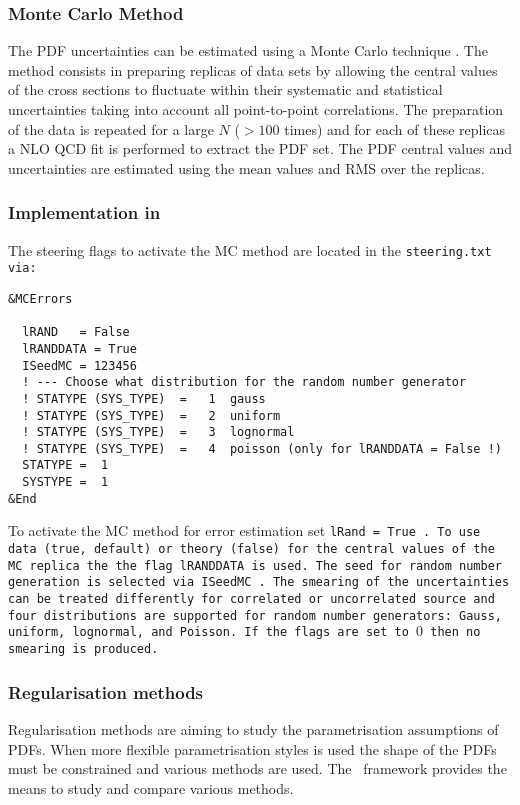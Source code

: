 \subsubsection{Monte Carlo Method}
\label{sec:ToyMC}

The PDF uncertainties can be estimated using a Monte Carlo technique \cite{Giele:1998gw, mcmethod2}.
The method consists in preparing replicas of data sets by allowing the central values of the cross sections to 
fluctuate within their systematic and statistical uncertainties taking into account all point-to-point correlations.
The preparation of the data is repeated for a large $N$ ($>100$ times) and for each of these replicas a NLO QCD fit is performed to 
extract the PDF set. The PDF central values and uncertainties are estimated using the mean values and RMS 
over the replicas. 
\subsubsection{Implementation in \fitter\ }
The steering flags to activate the MC method are located in the \tt steering.txt \rm via:

\begin{verbatim}
&MCErrors

  lRAND   = False  
  lRANDDATA = True
  ISeedMC = 123456 
  ! --- Choose what distribution for the random number generator 
  ! STATYPE (SYS_TYPE)  =   1  gauss
  ! STATYPE (SYS_TYPE)  =   2  uniform
  ! STATYPE (SYS_TYPE)  =   3  lognormal
  ! STATYPE (SYS_TYPE)  =   4  poisson (only for lRANDDATA = False !)
  STATYPE =  1
  SYSTYPE =  1
&End
\end{verbatim}
To activate the MC method for error estimation set \tt lRand = True \rm.
To use data (true, default) or theory (false) for the central values of the MC replica
the the flag \tt lRANDDATA \rm is used. The seed for random number generation is selected 
via \tt ISeedMC \rm . The smearing of the uncertainties can be treated differently for correlated 
or uncorrelated source and four distributions are supported for random number generators: Gauss, uniform, lognormal, and Poisson. If the flags are set to $0$ then no smearing is produced.




\subsubsection{Regularisation methods}

Regularisation methods are aiming to study the parametrisation assumptions of PDFs. 
When more flexible parametrisation styles is used the shape of the PDFs must be constrained and various methods are used.
The \fitter\ framework provides the means to study and compare various methods.

